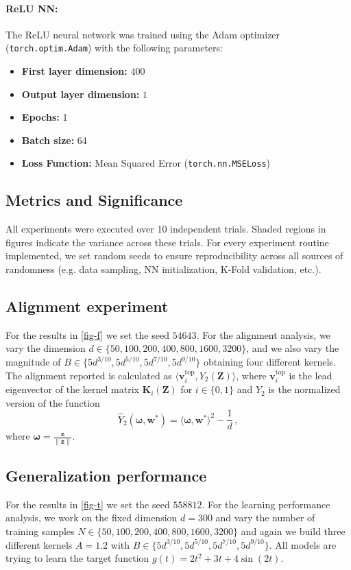 \paragraph{ReLU NN:}
The ReLU neural network was trained using the Adam optimizer (\texttt{torch.optim.Adam}) with the following parameters:
\begin{itemize}[leftmargin=*,topsep=0.5mm, itemsep=0.mm]
    \item \textbf{First layer dimension:} $400$
    \item \textbf{Output layer dimension:} $1$
    \item \textbf{Epochs:} 1
    \item \textbf{Batch size:} 64
    \item \textbf{Loss Function:} Mean Squared Error (\texttt{torch.nn.MSELoss})
\end{itemize}

\subsection{Metrics and Significance}
All experiments were executed over 10 independent trials. Shaded regions in figures indicate the variance across these trials. For every experiment routine implemented, we set random seeds to ensure reproducibility across all sources of randomness (e.g. data sampling, NN initialization, K-Fold validation, etc.).

\subsection{Alignment experiment}
For the results in \cref{fig-f} we set the seed $54643$. For the alignment analysis, we vary the dimension $d \in \{50, 100, 200, 400, 800, 1600, 3200\}$, and we also vary the magnitude of $B \in \{5d^{3/10}, 5d^{5/10}, 5d^{7/10}, 5d^{9/10}\}$ obtaining four different kernels. The alignment reported is calculated as $\langle \bm {v}_i^{\text{top}}, Y_2(\bm {Z}) \rangle$, where $\bm {v}_i^{\text{top}}$ is the lead eigenvector of the kernel matrix $\bm {K}_i(\bm {Z})$ for $i \in \{0, 1\}$ and $Y_2$ is the normalized version of the function
\[
    \hat{Y}_2(\bm \omega, \bm w^*) = \langle \bm \omega, \bm w^*\rangle^2 - \frac{1}{d}\, ,
\]
where $\bm \omega = \frac{\bm z}{\|\bm z\|}$.

\subsection{Generalization performance}
For the results in \cref{fig-t} we set the seed $558812$. For the learning performance analysis, we work on the fixed dimension $d=300$ and vary the number of training samples $N \in \{50, 100, 200, 400, 800, 1600, 3200\}$ and again we build three different kernels $A = 1.2$ with $B \in \{5d^{3/10}, 5d^{5/10}, 5d^{7/10}, 5d^{9/10}\}$. All models are trying to learn the target function $g(t) = 2t^2 + 3t + 4\sin(2t)$.

